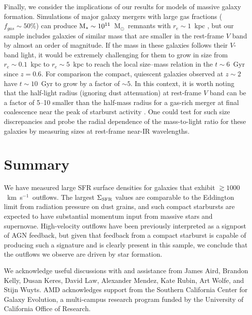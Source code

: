 \documentclass[apj]{emulateapj}
\newcommand{\kms}{km~s$^{-1}$}
\newcommand{\msun}{M$_{\odot}$}
\newcommand{\mstar}{M$_{*}$}
\newcommand{\sigmasfr}{\Sigma_{\textnormal{\scriptsize{SFR}}}}
\begin{document}
Finally, we consider the implications of our results for models of
massive galaxy formation.  Simulations of major galaxy mergers with
large gas fractions ($f_{gas}\sim50$\%) can produce
$\textnormal{\mstar}\sim10^{11}$~\msun\ remnants with $r_{e}\sim1$~kpc
\citep{wuy10}, but our sample includes galaxies of similar mass that
are smaller in the rest-frame $V$ band by almost an order of
magnitude.  If the mass in these galaxies follows their $V$-band
light, it would be extremely challenging for them to grow in size from
$r_e\sim0.1$~kpc to $r_e\sim5$~kpc to reach the local size--mass
relation \citep{she03} in the $t\sim6$~Gyr since $z=0.6$.  For
comparison the compact, quiescent galaxies observed at $z\sim2$
\citep{tru07,van08} have $t\sim10$~Gyr to grow by a factor of $\sim5$.
In this context, it is worth noting that the half-light radius
(ignoring dust attenuation) at rest-frame $V$ band can be a factor of
5--10 smaller than the half-mass radius for a gas-rich merger at final
coalescence near the peak of starburst activity \citep{wuy10}.  One
could test for such size discrepancies and probe the radial dependence
of the mass-to-light ratio for these galaxies by measuring sizes at
rest-frame near-IR wavelengths.

 

\section{Summary}

We have measured large SFR surface densities for galaxies that exhibit
$\gtrsim1000$~\kms\ outflows.  The largest $\sigmasfr$ values are
comparable to the Eddington limit from radiation pressure on dust
grains, and such compact starbursts are expected to have substantial
momentum input from massive stars and supernovae.  High-velocity
outflows have been previously interpreted as a signpost of AGN
feedback, but given that feedback from a compact starburst is capable
of producing such a signature and is clearly present in this sample,
we conclude that the outflows we observe are driven by star formation.


\acknowledgments

We acknowledge useful discussions with and assistance from James Aird,
Brandon Kelly, Dusan Keres, David Law, Alexander Mendez, Kate Rubin,
Art Wolfe, and Stijn Wuyts.  AMD acknowledges support from the
Southern California Center for Galaxy Evolution, a multi-campus
research program funded by the University of California Office of
Research.
\end{document}
